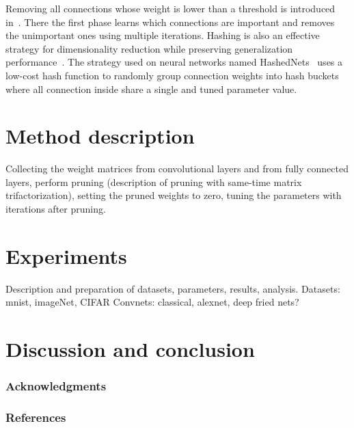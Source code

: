 \documentclass{article} %
\begin{document}
Removing all connections whose weight is lower than a 
threshold is introduced in~\cite{han2015learning}. There the first phase learns 
which connections are 
important and removes the unimportant ones using multiple iterations. Hashing is 
also an effective strategy for dimensionality reduction while preserving 
generalization performance~\cite{weinberger2009feature, shi2009hash}. The 
strategy used on neural networks named HashedNets~\cite{chen2015compressing} 
uses a low-cost hash function to randomly group connection weights into hash 
buckets where all connection inside share a single and tuned parameter value.  
 




\section{Method description}
Collecting the weight matrices from convolutional layers and from fully 
connected layers, perform pruning (description of pruning with same-time matrix 
trifactorization), setting the pruned weights to zero, tuning the parameters 
with iterations after pruning.


\section{Experiments}
Description and preparation of datasets, parameters, results, analysis.
Datasets: mnist, imageNet, CIFAR
Convnets: classical, alexnet, deep fried nets?


\section{Discussion and conclusion}



\subsubsection*{Acknowledgments}



\subsubsection*{References}




\end{document}
